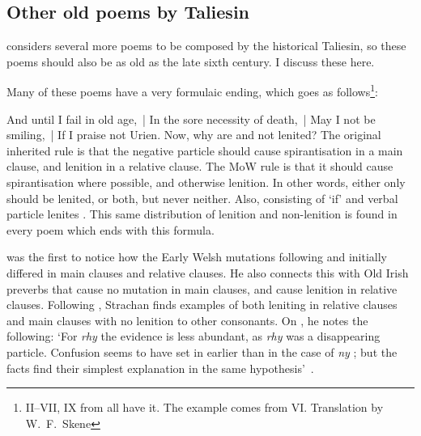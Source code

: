 \subsection{Other old poems by Taliesin}

\Textcite{williams_canu_1960} considers several more poems to be composed by the historical Taliesin, so these poems should also be as old as the late sixth century. I discuss these here.

Many of these poems have a very formulaic ending, which goes as follows\footnote{II--VII, IX from \textcite{williams_canu_1960} all have it. The example comes from VI. Translation by W.\ F.\ Skene}:

{And until I fail in old age,~|
In the sore necessity of death,~|
May I not be smiling,~|
If I praise not Urien. }
Now, why are  and  not lenited? The original inherited rule is that the negative particle should cause spirantisation in a main clause, and lenition in a relative clause. The MoW rule is that it should cause spirantisation where possible, and otherwise lenition. In other words, either only  should be lenited, or both, but never neither. Also,  consisting of  `if' and verbal particle  lenites . This same distribution of lenition and non-lenition is found  in every poem which ends with this formula. 

\Textcite{strachan_mutations_1907} was the first to notice how the Early Welsh mutations following  and  initially differed in main clauses and relative clauses. He also connects this with Old Irish preverbs that cause no mutation in main clauses, and cause lenition in relative clauses. Following , Strachan finds examples of both leniting  in relative clauses and main clauses with no lenition to other consonants. On , he notes the following: `For \textit{rhy} the evidence is less abundant, as \textit{rhy} was a disappearing particle. Confusion seems to have set in earlier than in the case of \textit{ny} ; but the facts find their simplest explanation in the same hypothesis'~\autocite[23]{strachan_mutations_1907}.

